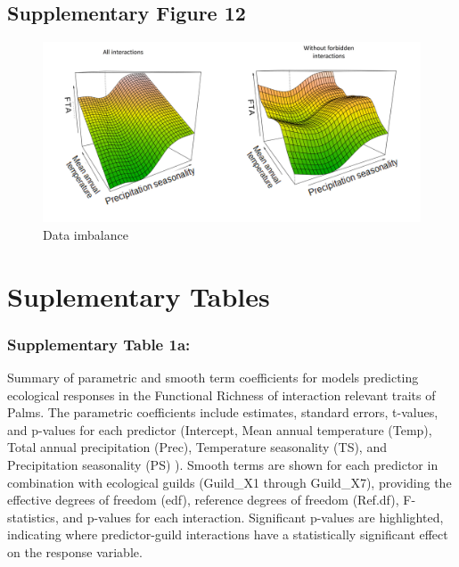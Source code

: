 \documentclass[
]{agujournal2019}
\begin{document}
\subsection{Supplementary Figure 12}

\begin{figure}[H]

{\centering \includegraphics[width=5.67708in,height=\textheight]{sup_figures/fta_surface_both.jpg}

}

\caption{Data imbalance}

\end{figure}%

\section{Suplementary Tables}\label{suplementary-tables}

\subsubsection{Supplementary Table 1a:}\label{supplementary-table-1a}

Summary of parametric and smooth term coefficients for models predicting
ecological responses in the Functional Richness of interaction relevant
traits of Palms. The parametric coefficients include estimates, standard
errors, t-values, and p-values for each predictor (Intercept, Mean
annual temperature (Temp), Total annual precipitation (Prec),
Temperature seasonality (TS), and Precipitation seasonality (PS) ).
Smooth terms are shown for each predictor in combination with ecological
guilds (Guild\_X1 through Guild\_X7), providing the effective degrees of
freedom (edf), reference degrees of freedom (Ref.df), F-statistics, and
p-values for each interaction. Significant p-values are highlighted,
indicating where predictor-guild interactions have a statistically
significant effect on the response variable.
\end{document}
